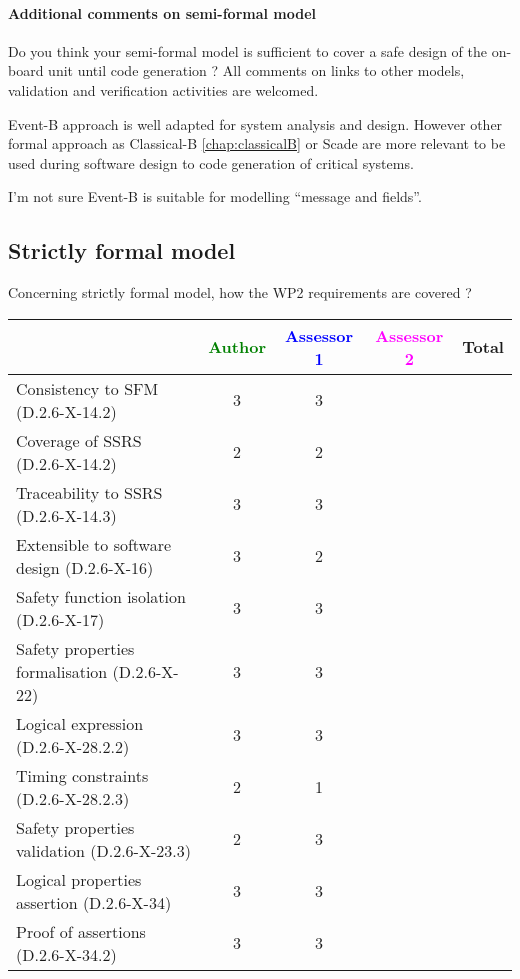 \paragraph{Additional comments on semi-formal  model} Do you think your semi-formal  model is sufficient to cover a safe design of the on-board unit until code generation ?
All comments on links to  other models, validation and verification activities are welcomed.


\begin{author_comment}
Event-B  approach is well adapted for system analysis and design. However other formal approach as Classical-B \ref{chap:classicalB} or Scade are more relevant to be used during software design to code generation of critical systems.
\end{author_comment}


\begin{assessor1}
I'm not sure Event-B is suitable for modelling ``message and fields''.
\end{assessor1}


\subsection{Strictly formal model}

Concerning strictly formal model, how the WP2 requirements are covered ?

\begin{tabular}{|l | c | c | c | c|}
\hline
& \textcolor{green}{Author} & \textcolor{blue}{Assessor 1} & \textcolor{magenta}{Assessor 2} & Total \\
\hline 
Consistency to SFM (D.2.6-X-14.2) & 3 & 3 & &  \\
\hline
Coverage of SSRS (D.2.6-X-14.2)  & 2 & 2 & &  \\
\hline
Traceability to  SSRS (D.2.6-X-14.3)  & 3 & 3 & &  \\
\hline
Extensible to software design (D.2.6-X-16)  & 3 & 2 & &  \\
\hline
Safety function isolation (D.2.6-X-17)  & 3 & 3 & &  \\
\hline 
Safety properties formalisation (D.2.6-X-22)  & 3 & 3 & &  \\
\hline
Logical expression (D.2.6-X-28.2.2)  & 3 & 3 & &  \\
\hline
Timing constraints (D.2.6-X-28.2.3)  & 2 & 1 & &  \\
\hline
Safety properties validation (D.2.6-X-23.3)  & 2 & 3 & &  \\
\hline
Logical properties assertion (D.2.6-X-34)  & 3 & 3 & &  \\
\hline
Proof of assertions (D.2.6-X-34.2)  & 3 & 3 & &  \\
\hline
\end{tabular}

